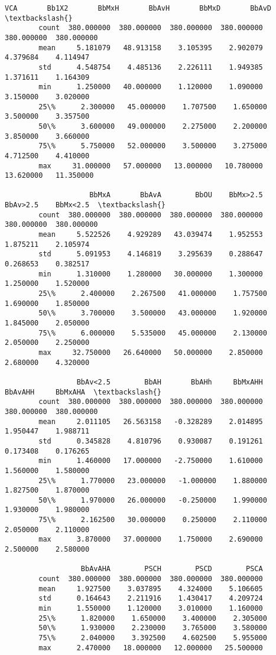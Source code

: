 \documentclass[11pt]{article}
\begin{document}
\begin{Verbatim}[commandchars=\\\{\}]
                      VCA       Bb1X2       BbMxH       BbAvH       BbMxD       BbAvD  \textbackslash{}
        count  380.000000  380.000000  380.000000  380.000000  380.000000  380.000000   
        mean     5.181079   48.913158    3.105395    2.902079    4.379684    4.114947   
        std      4.548754    4.485136    2.226111    1.949385    1.371611    1.164309   
        min      1.250000   40.000000    1.120000    1.090000    3.150000    3.020000   
        25\%      2.300000   45.000000    1.707500    1.650000    3.500000    3.357500   
        50\%      3.600000   49.000000    2.275000    2.200000    3.850000    3.660000   
        75\%      5.750000   52.000000    3.500000    3.275000    4.712500    4.410000   
        max     31.000000   57.000000   13.000000   10.780000   13.620000   11.350000   
        
                    BbMxA       BbAvA        BbOU    BbMx>2.5    BbAv>2.5    BbMx<2.5  \textbackslash{}
        count  380.000000  380.000000  380.000000  380.000000  380.000000  380.000000   
        mean     5.522526    4.929289   43.039474    1.952553    1.875211    2.105974   
        std      5.091953    4.146819    3.295639    0.288647    0.268653    0.382517   
        min      1.310000    1.280000   30.000000    1.300000    1.250000    1.520000   
        25\%      2.400000    2.267500   41.000000    1.757500    1.690000    1.850000   
        50\%      3.700000    3.500000   43.000000    1.920000    1.845000    2.050000   
        75\%      6.000000    5.535000   45.000000    2.130000    2.050000    2.250000   
        max     32.750000   26.640000   50.000000    2.850000    2.680000    4.320000   
        
                 BbAv<2.5        BbAH       BbAHh     BbMxAHH     BbAvAHH     BbMxAHA  \textbackslash{}
        count  380.000000  380.000000  380.000000  380.000000  380.000000  380.000000   
        mean     2.011105   26.563158   -0.328289    2.014895    1.950447    1.988711   
        std      0.345828    4.810796    0.930087    0.191261    0.173408    0.176265   
        min      1.460000   17.000000   -2.750000    1.610000    1.560000    1.580000   
        25\%      1.770000   23.000000   -1.000000    1.880000    1.827500    1.870000   
        50\%      1.970000   26.000000   -0.250000    1.990000    1.930000    1.980000   
        75\%      2.162500   30.000000    0.250000    2.110000    2.050000    2.110000   
        max      3.870000   37.000000    1.750000    2.690000    2.500000    2.580000   
        
                  BbAvAHA        PSCH        PSCD        PSCA  
        count  380.000000  380.000000  380.000000  380.000000  
        mean     1.927500    3.037895    4.324000    5.106605  
        std      0.164643    2.211916    1.430417    4.209724  
        min      1.550000    1.120000    3.010000    1.160000  
        25\%      1.820000    1.650000    3.400000    2.305000  
        50\%      1.930000    2.230000    3.765000    3.580000  
        75\%      2.040000    3.392500    4.602500    5.955000  
        max      2.470000   18.000000   12.000000   25.500000  
\end{Verbatim}
            
\end{document}

